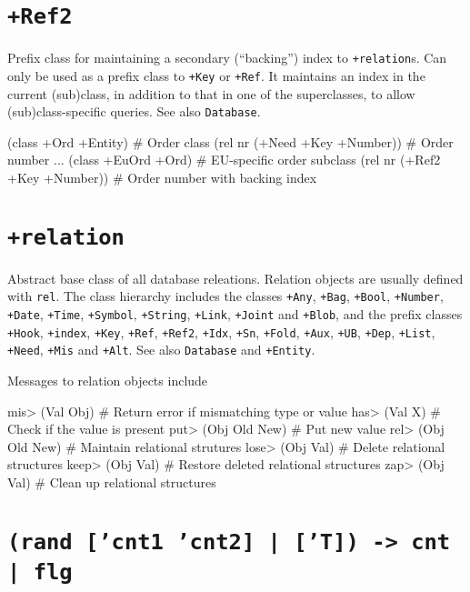  
\section*{\texttt{+Ref2}}
\label{sec:func-ref-R-+Ref2}


Prefix class for maintaining a secondary (``backing'') index to
\texttt{+relation}s. Can only be used as a prefix class to
\texttt{+Key} or \texttt{+Ref}. It maintains an index in the current
(sub)class, in addition to that in one of the superclasses, to allow
(sub)class-specific queries. See also \texttt{Database}.


\begin{wideverbatim}
(class +Ord +Entity)             # Order class
(rel nr (+Need +Key +Number))    # Order number
...
(class +EuOrd +Ord)              # EU-specific order subclass
(rel nr (+Ref2 +Key +Number))    # Order number with backing index
\end{wideverbatim}

 
\section*{\texttt{+relation}}
\label{sec:func-ref-R-+relation}


Abstract base class of all database releations. Relation objects are
usually defined with \texttt{rel}. The class hierarchy includes the classes
\texttt{+Any}, \texttt{+Bag}, \texttt{+Bool}, \texttt{+Number}, \texttt{+Date}, \texttt{+Time}, \texttt{+Symbol},
\texttt{+String}, \texttt{+Link}, \texttt{+Joint} and \texttt{+Blob}, and the prefix classes
\texttt{+Hook}, \texttt{+index}, \texttt{+Key}, \texttt{+Ref}, \texttt{+Ref2}, \texttt{+Idx}, \texttt{+Sn}, \texttt{+Fold},
\texttt{+Aux}, \texttt{+UB}, \texttt{+Dep}, \texttt{+List}, \texttt{+Need}, \texttt{+Mis} and \texttt{+Alt}. See also
\texttt{Database} and \texttt{+Entity}.

Messages to relation objects include


\begin{wideverbatim}
mis> (Val Obj)       # Return error if mismatching type or value
has> (Val X)         # Check if the value is present
put> (Obj Old New)   # Put new value
rel> (Obj Old New)   # Maintain relational strutures
lose> (Obj Val)      # Delete relational structures
keep> (Obj Val)      # Restore deleted relational structures
zap> (Obj Val)       # Clean up relational structures
\end{wideverbatim}

 
\section*{\texttt{(rand ['cnt1 'cnt2] | ['T]) -> cnt | flg}}
\label{sec:func-ref-R-(rand ['cnt1 'cnt2] | ['T]) -> cnt | flg}


